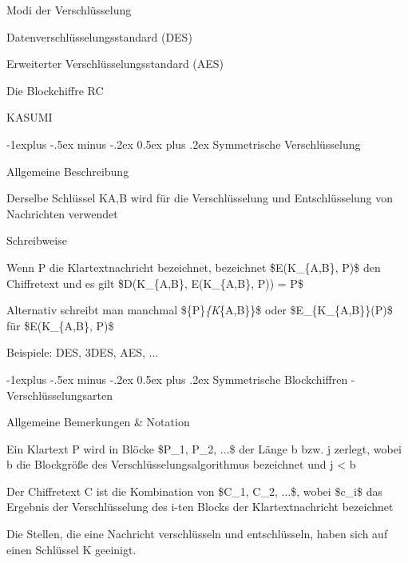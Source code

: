 \documentclass[a4paper]{article}
\makeatletter
\renewcommand{\subsection}{\@startsection{subsection}{2}{0mm}%
 {-1explus -.5ex minus -.2ex}%
 {0.5ex plus .2ex}%
 {\normalfont\normalsize\bfseries}}
\makeatother
\begin{document}
\begin{multicols}{3}
      \begin{itemize*}
            \item Modi der Verschlüsselung
            \item Datenverschlüsselungsstandard (DES)
            \item Erweiterter Verschlüsselungsstandard (AES)
            \item Die Blockchiffre RC
            \item KASUMI
      \end{itemize*}


      \subsection{Symmetrische
            Verschlüsselung}

      \begin{itemize*}
            \item Allgemeine Beschreibung
            \begin{itemize*}
                  \item Derselbe Schlüssel KA,B wird für die Verschlüsselung und Entschlüsselung von Nachrichten verwendet
            \end{itemize*}
            \item Schreibweise
            \begin{itemize*}
                  \item Wenn P die Klartextnachricht bezeichnet, bezeichnet \$E(K\_\{A,B\}, P)\$ den Chiffretext und es gilt \$D(K\_\{A,B\}, E(K\_\{A,B\}, P)) = P\$
                  \item Alternativ schreibt man manchmal \$\{P\}\emph{\{K}\{A,B\}\}\$ oder \$E\_\{K\_\{A,B\}\}(P)\$ für \$E(K\_\{A,B\}, P)\$
            \end{itemize*}
            \item Beispiele: DES, 3DES, AES, ...
      \end{itemize*}


      \subsection{Symmetrische Blockchiffren -
            Verschlüsselungsarten}

      Allgemeine Bemerkungen \& Notation

      \begin{itemize*}
            \item Ein Klartext P wird in Blöcke \$P\_1, P\_2, ...\$ der Länge b bzw. j
            zerlegt, wobei b die Blockgröße des Verschlüsselungsalgorithmus
            bezeichnet und j \textless{} b
            \item Der Chiffretext C ist die Kombination von \$C\_1, C\_2, ...\$, wobei
            \$c\_i\$ das Ergebnis der Verschlüsselung des i-ten Blocks der
            Klartextnachricht bezeichnet
            \item Die Stellen, die eine Nachricht verschlüsseln und entschlüsseln, haben
            sich auf einen Schlüssel K geeinigt.
      \end{itemize*}


\end{multicols}
\end{document}
